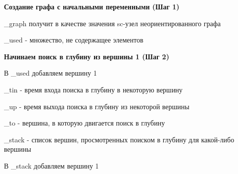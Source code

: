 \documentclass[a4paper]{article}
\begin{document}
\textbf{Создание графа с начальными переменными (Шаг 1)}
  \begin{figure}[!h]
  \end{figure}
\par
  \_graph получит в качестве значения sc-узел неориентированного графа\par
  \_used - множество, не содержащее элементов
\newpage
  
\textbf{Начинаем поиск в глубину из вершины 1 (Шаг 2)}
  \begin{figure}[!h]
  \end{figure}
\par
  В \_used добавляем вершину 1\par
  \_tin - время входа поиска в глубину в некоторую вершину\par
  \_up - время выхода поиска в глубину из некоторой вершины\par
  \_to - вершина, в которую двигается поиск в глубину\par
  \_stack - список вершин, просмотренных поиском в глубину для какой-либо вершины\par
  В \_stack добавляем вершину 1
\newpage
  
\end{document}
